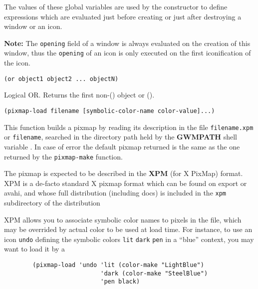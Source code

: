 

The values of these global variables are used by the 
constructor to define {\WOOL} expressions which are evaluated just before
creating or just after destroying a window or an icon. 

{\bf Note:} The \verb"opening" field of a window is always evaluated on the
creation of this window, thus the \verb"opening" of an icon is only
executed on the first iconification of the icon.

        
{\usagefont\begin{verbatim}
(or object1 object2 ... objectN)
\end{verbatim}}\usageupspace

Logical OR. Returns the first non-() object or ().

        
{\usagefont\begin{verbatim}
(pixmap-load filename [symbolic-color-name color-value]...)
\end{verbatim}}\usageupspace

This function builds a pixmap by reading its description in the file
\verb"filename.xpm" or \verb"filename", searched in the directory path held
by the {\bf GWMPATH} shell variable . 
In case of
error the default pixmap returned is the same as the one returned by the
\verb"pixmap-make" function.

The pixmap is expected to be described in the {\bf XPM} (for X PixMap)
format. XPM is a de-facto standard X pixmap format which can be found on
export or avahi, and whose full distribution (including docs) is included in
the \verb|xpm| subdirectory of the {\GWM} distribution

XPM allows you to associate symbolic color names to pixels in the file, which
may be overrided by actual color to be used at load time. For instance, to use
an icon \verb|undo| defining the symbolic colors \verb|lit| \verb|dark|
\verb|pen| in a ``blue'' context, you may want to load it by a

{\exemplefont\begin{verbatim}
        (pixmap-load 'undo 'lit (color-make "LightBlue")
                           'dark (color-make "SteelBlue")
                           'pen black)
\end{verbatim}}

